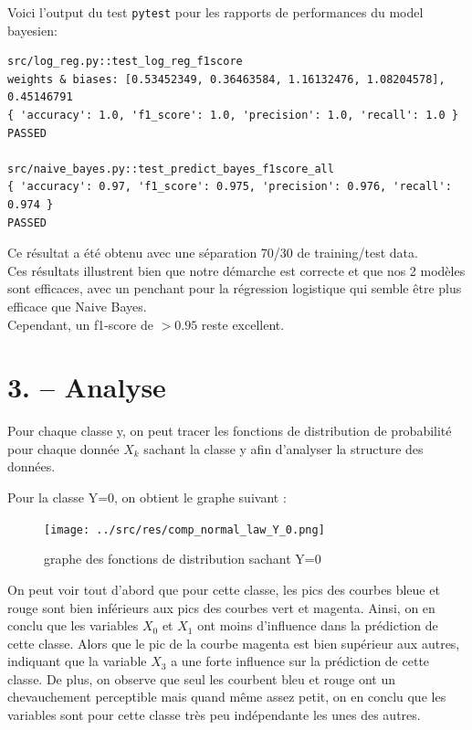\documentclass[
]{article}
\begin{document}
Voici l'output du test \texttt{pytest} pour les rapports de performances
du model bayesien:

\begin{lstlisting}
src/log_reg.py::test_log_reg_f1score 
weights & biases: [0.53452349, 0.36463584, 1.16132476, 1.08204578], 0.45146791  
{ 'accuracy': 1.0, 'f1_score': 1.0, 'precision': 1.0, 'recall': 1.0 }
PASSED

src/naive_bayes.py::test_predict_bayes_f1score_all  
{ 'accuracy': 0.97, 'f1_score': 0.975, 'precision': 0.976, 'recall': 0.974 }
PASSED
\end{lstlisting}

Ce résultat a été obtenu avec une séparation 70/30 de training/test
data.\\
Ces résultats illustrent bien que notre démarche est correcte et que nos
2 modèles sont efficaces, avec un penchant pour la régression logistique
qui semble être plus efficace que Naive Bayes.\\
Cependant, un f1-score de \(> 0.95\) reste excellent.

\newpage{}

\hypertarget{analyse}{%
\section{3. -- Analyse}\label{analyse}}

Pour chaque classe y, on peut tracer les fonctions de distribution de
probabilité pour chaque donnée \(X_k\) sachant la classe y afin
d'analyser la structure des données.

Pour la classe Y=0, on obtient le graphe suivant :

\begin{figure}
\centering
\texttt{[image: ../src/res/comp\_normal\_law\_Y\_0.png]}
\caption{graphe des fonctions de distribution sachant Y=0}
\end{figure}

On peut voir tout d'abord que pour cette classe, les pics des courbes
bleue et rouge sont bien inférieurs aux pics des courbes vert et
magenta. Ainsi, on en conclu que les variables \(X_0\) et \(X_1\) ont
moins d'influence dans la prédiction de cette classe. Alors que le pic
de la courbe magenta est bien supérieur aux autres, indiquant que la
variable \(X_3\) a une forte influence sur la prédiction de cette
classe. De plus, on observe que seul les courbent bleu et rouge ont un
chevauchement perceptible mais quand même assez petit, on en conclu que
les variables sont pour cette classe très peu indépendante les unes des
autres.
\end{document}
